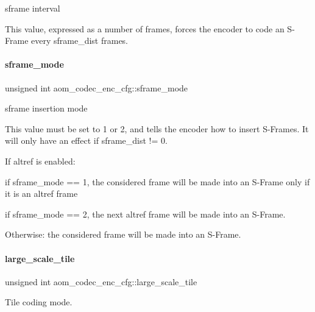 sframe interval 

This value, expressed as a number of frames, forces the encoder to code an S-\/\+Frame every sframe\+\_\+dist frames. \mbox{\label{structaom__codec__enc__cfg_aab919adaf0e01b41da93505a075b6804}} 
\paragraph{\texorpdfstring{sframe\+\_\+mode}{sframe\_mode}}
{\footnotesize\ttfamily unsigned int aom\+\_\+codec\+\_\+enc\+\_\+cfg\+::sframe\+\_\+mode}



sframe insertion mode 

This value must be set to 1 or 2, and tells the encoder how to insert S-\/\+Frames. It will only have an effect if sframe\+\_\+dist != 0.

If altref is enabled\+:
\begin{DoxyItemize}
\item if sframe\+\_\+mode == 1, the considered frame will be made into an S-\/\+Frame only if it is an altref frame
\item if sframe\+\_\+mode == 2, the next altref frame will be made into an S-\/\+Frame.
\end{DoxyItemize}

Otherwise\+: the considered frame will be made into an S-\/\+Frame. \mbox{\label{structaom__codec__enc__cfg_af4583da6c145778f822a4a61db28c40a}} 
\paragraph{\texorpdfstring{large\+\_\+scale\+\_\+tile}{large\_scale\_tile}}
{\footnotesize\ttfamily unsigned int aom\+\_\+codec\+\_\+enc\+\_\+cfg\+::large\+\_\+scale\+\_\+tile}



Tile coding mode. 

